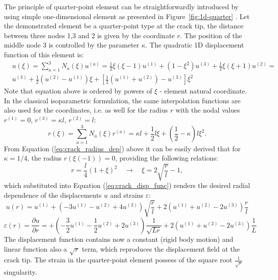 \documentclass[11pt]{acmeArticle}
\numberwithin{equation}{section}
\begin{document}
The principle of quarter-point element can be straightforwardly introduced by using simple one-dimensional element as presented in Figure~\ref{fig:1d-quarter} \citep{kuna2013finite}.
Let the demonstrated element be a quarter-point type at the crack tip, the distance between three nodes 1,3 and 2 is given by the coordinate $r$. The position of the middle node 3 is controlled by the parameter $\kappa$. The quadratic 1D displacement function of this element is: 
\begin{equation}\label{eq:crack_disp_func}
\begin{aligned}
&u(\xi) = \sum_{a=1}^3 N_a (\xi) u^{(a)} = \frac{1}{2} \xi (\xi - 1)u^{(1)} + (1 - \xi^2)u^{(3)} + \frac{1}{2} \xi (\xi + 1)u^{(2)} =\\
& u^{(3)} + \frac{1}{2}(u^{(2)} - u^{(1)})\xi + \left[ \frac{1}{2} (u^{(1)} + u^{(2)}) - u^{(3)} \right] \xi^2 
\end{aligned}
\end{equation}
Note that equation above is ordered by powers of $\xi$ - element natural coordinate. In the classical isoparametric formulation, the same interpolation functions are also used for the coordinates, i.e. as well for the radius $r$ with the nodal values $r^{(1)} = 0$, $r^{(3)} = \kappa l$, $r^{(2)} = l$:
\begin{equation}\label{eq:crack_radius_dep}
r(\xi) = \sum_{a=1}^3 N_a (\xi) r^{(a)} = \kappa l + \frac{1}{2} l \xi  + \left(  \frac{1}{2} - \kappa \right) l \xi^2.
\end{equation}
From Equation (\ref{eq:crack_radius_dep}) above it can be easily derived that for $ \kappa=1/4$, the radius $r(\xi(-1)) = 0$, providing the following relations:
\begin{equation}
r= \frac{l}{4}(1+\xi)^2 \quad \rightarrow \quad \xi = 2 \sqrt{\frac{r}{l}} -1,
\end{equation}
which substituted into Equation (\ref{eq:crack_disp_func}) renders the desired radial dependence of the displacements $u$ and strains $\varepsilon$:
\begin{equation*}
u(r) = u^{(1)} + \left( -3u^{(1)} - u^{(2)} +4u^{(3)} \right) \sqrt{\frac{r}{l}} + 2 \left( u^{(1)} + u^{(2)} -2 u^{(3)} \right) \frac{r}{l}
\end{equation*}
\begin{equation}
\varepsilon(r) = \frac{\partial u}{ \partial r} = + \left( - \frac{3}{2}u^{(1)} - \frac{1}{2}u^{(2)} +2u^{(3)} \right) \frac{1}{\sqrt{Lr}} + 2 \left( u^{(1)} + u^{(2)} -2 u^{(3)} \right) \frac{1}{L}
\end{equation}
The displacement function contains now a constant (rigid body motion) and linear function also a $\sqrt r$ term, which reproduces the displacement field at the crack tip. The strain in the quarter-point element possess of the square root $\frac{1}{\sqrt r}$ singularity.
\end{document}
